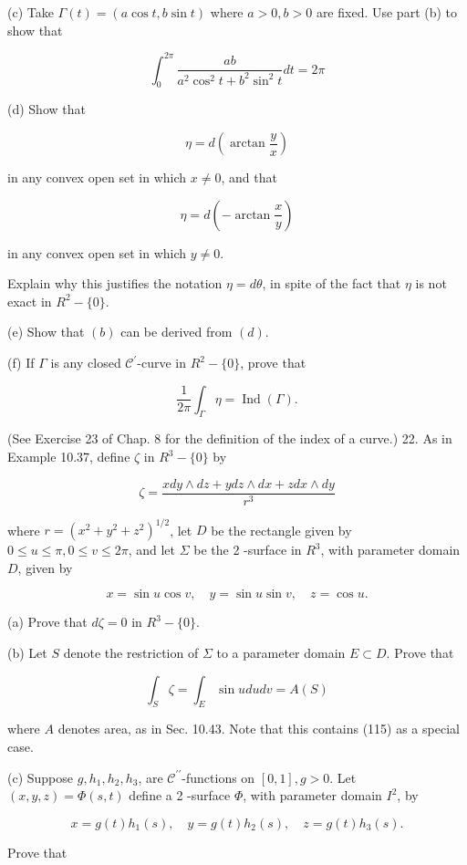 \documentclass[10pt]{article}
\begin{document}
(c) Take $\Gamma(t)=(a \cos t, b \sin t)$ where $a>0, b>0$ are fixed. Use part (b) to show that

$$
\int_{0}^{2 \pi} \frac{a b}{a^{2} \cos ^{2} t+b^{2} \sin ^{2} t} d t=2 \pi
$$

(d) Show that

$$
\eta=d\left(\arctan \frac{y}{x}\right)
$$

in any convex open set in which $x \neq 0$, and that

$$
\eta=d\left(-\arctan \frac{x}{y}\right)
$$

in any convex open set in which $y \neq 0$.

Explain why this justifies the notation $\eta=d \theta$, in spite of the fact that $\eta$ is not exact in $R^{2}-\{0\}$.

(e) Show that $(b)$ can be derived from $(d)$.

(f) If $\Gamma$ is any closed $\mathscr{C}^{\prime}$-curve in $R^{2}-\{0\}$, prove that

$$
\frac{1}{2 \pi} \int_{\Gamma} \eta=\operatorname{Ind}(\Gamma) .
$$

(See Exercise 23 of Chap. 8 for the definition of the index of a curve.) 22. As in Example 10.37, define $\zeta$ in $R^{3}-\{0\}$ by

$$
\zeta=\frac{x d y \wedge d z+y d z \wedge d x+z d x \wedge d y}{r^{3}}
$$

where $r=\left(x^{2}+y^{2}+z^{2}\right)^{1 / 2}$, let $D$ be the rectangle given by $0 \leq u \leq \pi, 0 \leq v \leq 2 \pi$, and let $\Sigma$ be the 2 -surface in $R^{3}$, with parameter domain $D$, given by

$$
x=\sin u \cos v, \quad y=\sin u \sin v, \quad z=\cos u .
$$

(a) Prove that $d \zeta=0$ in $R^{3}-\{0\}$.

(b) Let $S$ denote the restriction of $\Sigma$ to a parameter domain $E \subset D$. Prove that

$$
\int_{S} \zeta=\int_{E} \sin u d u d v=A(S)
$$

where $A$ denotes area, as in Sec. 10.43. Note that this contains (115) as a special case.

(c) Suppose $g, h_{1}, h_{2}, h_{3}$, are $\mathscr{C}^{\prime \prime}$-functions on $[0,1], g>0$. Let $(x, y, z)=\Phi(s, t)$ define a 2 -surface $\Phi$, with parameter domain $I^{2}$, by

$$
x=g(t) h_{1}(s), \quad y=g(t) h_{2}(s), \quad z=g(t) h_{3}(s) .
$$

Prove that
\end{document}
